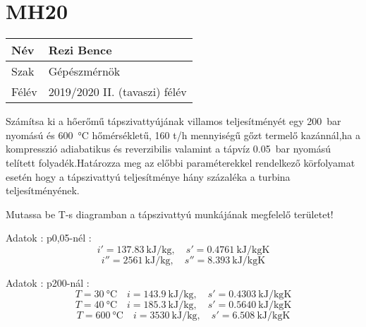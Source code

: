 \section*{MH20}
\begin{tabular}{ | p{2cm} | p{14cm} | } 
	\hline
	Név & Rezi Bence \\ 
	\hline
	Szak & Gépészmérnök \\ 
	\hline
	Félév & 2019/2020 II. (tavaszi) félév \\ 
	\hline
\end{tabular}
\vspace{0.5cm}

\noindent 	Számítsa ki a hőerőmű tápszivattyújának villamos teljesítményét egy \SI{200}{\bar} nyomású és \SI{600}{\celsius} hőmérsékletű, 160 t/h mennyiségű gőzt termelő kazánnál,ha a kompresszió adiabatikus és reverzibilis valamint a tápvíz \SI{0,05}{\bar} nyomású telített folyadék.Határozza meg az előbbi paraméterekkel rendelkező körfolyamat esetén hogy a tápszivattyú teljesítménye hány százaléka a turbina teljesítményének.

\vspace{2mm}
\noindent Mutassa be T-s diagramban a tápszivattyú munkájának megfelelő területet! 

\vspace{5mm}
\noindent Adatok : p0,05-nél :
\begin{equation*}
	i' = \SI{137,83}{\kilo\joule\per\kilogram},
	\quad
	s' = \SI{0,4761}{\kilo\joule\per\kilogram\kelvin}
\end{equation*}
\begin{equation*}
	i'' = \SI{2561}{\kilo\joule\per\kilogram},
	\quad
	s'' = \SI{8,393}{\kilo\joule\per\kilogram\kelvin}
\end{equation*}

\vspace{2mm}
\noindent Adatok : p200-nál :
\begin{equation*}
	T  =\SI{30}{\celsius}
	\quad
	i = \SI{143,9}{\kilo\joule\per\kilogram},
	\quad
	s' = \SI{0,4303}{\kilo\joule\per\kilogram\kelvin}
\end{equation*}
\begin{equation*}
	T  =\SI{40}{\celsius}
	\quad
	i = \SI{185,3}{\kilo\joule\per\kilogram},
	\quad
	s' = \SI{0,5640}{\kilo\joule\per\kilogram\kelvin}
\end{equation*}
\begin{equation*}
	T  =\SI{600}{\celsius}
	\quad
	i = \SI{3530}{\kilo\joule\per\kilogram},
	\quad
	s' = \SI{6,508}{\kilo\joule\per\kilogram\kelvin}
\end{equation*}
\vspace{5mm}


